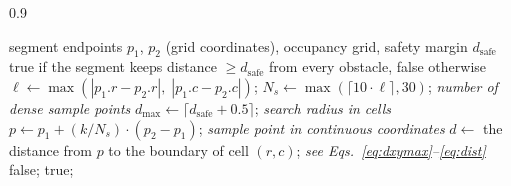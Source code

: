\documentclass[lettersize,journal]{IEEEtran}
\begin{document}
\begin{algorithm}[!t]
\caption{IsLineFree }
\label{alg:islinefree}
\begin{spacing}{0.9}
\begin{algorithmic}[1]
\REQUIRE segment endpoints $p_1$, $p_2$ (grid coordinates), occupancy grid, safety margin $d_{\mathrm{safe}}$
\ENSURE true if the segment keeps distance $\geq d_{\mathrm{safe}}$ from every obstacle, false otherwise
\STATE $\ell \gets \max(|p_1.r - p_2.r|,\; |p_1.c - p_2.c|)$;
\STATE $N_s \gets \max(\lceil 10 \cdot \ell \rceil, 30)$; \quad\textit{number of dense sample points}
\STATE $d_{\max} \gets \lceil d_{\mathrm{safe}} + 0.5 \rceil$; \quad\textit{search radius in cells}
\STATE $p \gets p_1 + (k / N_s) \cdot (p_2 - p_1)$; \quad\textit{sample point in continuous coordinates}
\STATE $d \gets$ the distance from $p$ to the boundary of cell $(r, c)$; \quad\textit{see Eqs.~\textcolor{blue}{\eqref{eq:dxymax}}--\textcolor{blue}{\eqref{eq:dist}}}
\STATE \RETURN false;
\ENDIF
\ENDIF
\ENDFOR
\ENDFOR
\RETURN true;
\end{algorithmic}
\end{spacing}
\end{algorithm}
\end{document}

